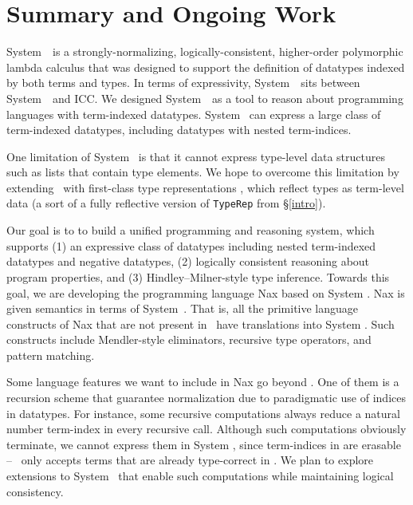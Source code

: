 \section{Summary and Ongoing Work} \label{sec:concl}
System~\Fi\ is a strongly-normalizing, logically-consistent, higher-order
polymorphic lambda calculus that was designed to support the
definition of datatypes indexed by both terms and types.
In terms of expressivity, System~\Fi\ sits between System~\Fw\ and ICC.
We designed System~\Fi\ as a tool to reason about programming
languages with term-indexed datatypes. System \Fi\ can express
a large class of term-indexed datatypes, including datatypes
with nested term-indices.

One limitation of System \Fi\ is that it cannot express type-level
data structures such as lists that contain type elements.
We hope to overcome this limitation by extending \Fi\ 
with first-class type representations \cite{DagMcb12}, which reflect
types as term-level data (a sort of a fully reflective version of
{\small\tt TypeRep} from \S\ref{intro}).

Our goal is to to build a unified programming and reasoning system,
which supports
(1) an expressive class of datatypes including nested term-indexed datatypes
and negative datatypes,
(2) logically consistent reasoning about program properties, and
(3) Hindley--Milner-style type inference.
Towards this goal, we are developing the programming language
Nax based on System \Fi.
Nax is given semantics in terms of System~\Fi.
That is, all the primitive language constructs of Nax that are not present
in \Fi\ have translations into System \Fi. Such constructs include
Mendler-style eliminators, recursive type operators, and
pattern matching.

Some language features we want to include in Nax go beyond \Fi.
One of them is a recursion scheme that guarantee normalization
due to paradigmatic use of indices in datatypes. For instance,
some recursive computations always reduce a natural number term-index
in every recursive call. Although such computations obviously terminate,
we cannot express them in System \Fi, since term-indices in are erasable
-- \Fi\ only accepts terms that are already type-correct in \Fw.
We plan to explore extensions to System \Fi\ that enable such computations
while maintaining logical consistency.

